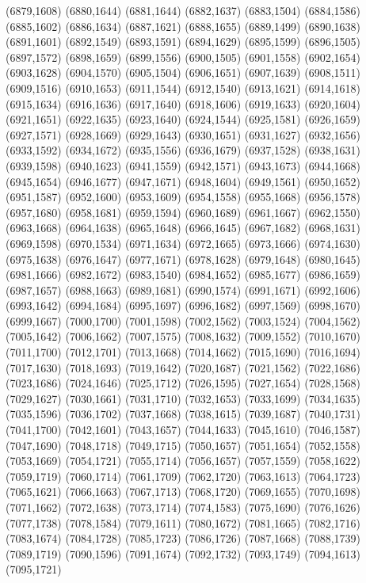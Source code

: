 (6879,1608)
(6880,1644)
(6881,1644)
(6882,1637)
(6883,1504)
(6884,1586)
(6885,1602)
(6886,1634)
(6887,1621)
(6888,1655)
(6889,1499)
(6890,1638)
(6891,1601)
(6892,1549)
(6893,1591)
(6894,1629)
(6895,1599)
(6896,1505)
(6897,1572)
(6898,1659)
(6899,1556)
(6900,1505)
(6901,1558)
(6902,1654)
(6903,1628)
(6904,1570)
(6905,1504)
(6906,1651)
(6907,1639)
(6908,1511)
(6909,1516)
(6910,1653)
(6911,1544)
(6912,1540)
(6913,1621)
(6914,1618)
(6915,1634)
(6916,1636)
(6917,1640)
(6918,1606)
(6919,1633)
(6920,1604)
(6921,1651)
(6922,1635)
(6923,1640)
(6924,1544)
(6925,1581)
(6926,1659)
(6927,1571)
(6928,1669)
(6929,1643)
(6930,1651)
(6931,1627)
(6932,1656)
(6933,1592)
(6934,1672)
(6935,1556)
(6936,1679)
(6937,1528)
(6938,1631)
(6939,1598)
(6940,1623)
(6941,1559)
(6942,1571)
(6943,1673)
(6944,1668)
(6945,1654)
(6946,1677)
(6947,1671)
(6948,1604)
(6949,1561)
(6950,1652)
(6951,1587)
(6952,1600)
(6953,1609)
(6954,1558)
(6955,1668)
(6956,1578)
(6957,1680)
(6958,1681)
(6959,1594)
(6960,1689)
(6961,1667)
(6962,1550)
(6963,1668)
(6964,1638)
(6965,1648)
(6966,1645)
(6967,1682)
(6968,1631)
(6969,1598)
(6970,1534)
(6971,1634)
(6972,1665)
(6973,1666)
(6974,1630)
(6975,1638)
(6976,1647)
(6977,1671)
(6978,1628)
(6979,1648)
(6980,1645)
(6981,1666)
(6982,1672)
(6983,1540)
(6984,1652)
(6985,1677)
(6986,1659)
(6987,1657)
(6988,1663)
(6989,1681)
(6990,1574)
(6991,1671)
(6992,1606)
(6993,1642)
(6994,1684)
(6995,1697)
(6996,1682)
(6997,1569)
(6998,1670)
(6999,1667)
(7000,1700)
(7001,1598)
(7002,1562)
(7003,1524)
(7004,1562)
(7005,1642)
(7006,1662)
(7007,1575)
(7008,1632)
(7009,1552)
(7010,1670)
(7011,1700)
(7012,1701)
(7013,1668)
(7014,1662)
(7015,1690)
(7016,1694)
(7017,1630)
(7018,1693)
(7019,1642)
(7020,1687)
(7021,1562)
(7022,1686)
(7023,1686)
(7024,1646)
(7025,1712)
(7026,1595)
(7027,1654)
(7028,1568)
(7029,1627)
(7030,1661)
(7031,1710)
(7032,1653)
(7033,1699)
(7034,1635)
(7035,1596)
(7036,1702)
(7037,1668)
(7038,1615)
(7039,1687)
(7040,1731)
(7041,1700)
(7042,1601)
(7043,1657)
(7044,1633)
(7045,1610)
(7046,1587)
(7047,1690)
(7048,1718)
(7049,1715)
(7050,1657)
(7051,1654)
(7052,1558)
(7053,1669)
(7054,1721)
(7055,1714)
(7056,1657)
(7057,1559)
(7058,1622)
(7059,1719)
(7060,1714)
(7061,1709)
(7062,1720)
(7063,1613)
(7064,1723)
(7065,1621)
(7066,1663)
(7067,1713)
(7068,1720)
(7069,1655)
(7070,1698)
(7071,1662)
(7072,1638)
(7073,1714)
(7074,1583)
(7075,1690)
(7076,1626)
(7077,1738)
(7078,1584)
(7079,1611)
(7080,1672)
(7081,1665)
(7082,1716)
(7083,1674)
(7084,1728)
(7085,1723)
(7086,1726)
(7087,1668)
(7088,1739)
(7089,1719)
(7090,1596)
(7091,1674)
(7092,1732)
(7093,1749)
(7094,1613)
(7095,1721)
